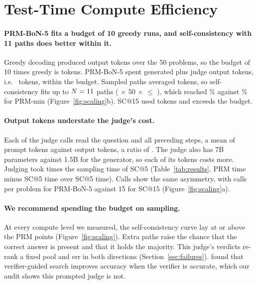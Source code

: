 \documentclass{article}
\begin{document}
\section{Test-Time Compute Efficiency}
\label{sec:compute}

\paragraph{PRM-BoN-5 fits a budget of 10 greedy runs, and self-consistency with 11 paths does better within it.} Greedy decoding produced \greedyTokens{} output tokens over the 50 problems, so the budget of 10 times greedy is \budgetTenX{} tokens. PRM-BoN-5 spent \prmGenTokens{} generated plus \prmJudgeOut{} judge output tokens, i.e.\ \prmSpent{} tokens, within the budget. Sampled paths averaged \genPerSample{} tokens, so self-consistency fits up to $N=11$ paths (\largestSCN{} $\times$ 50 $\times$ \genPerSample{} $\le$ \budgetTenX), which reached \accSCeleven\% against \accPRMmin\% for PRM-min (Figure~\ref{fig:scaling}b). SC@15 used \scTokensFifteen{} tokens and exceeds the budget.

\paragraph{Output tokens understate the judge's cost.} Each of the \judgeCalls{} judge calls read the question and all preceding steps, a mean of \judgeInPerCall{} prompt tokens against \judgeOutPerCall{} output tokens, a ratio of \judgeInOverOut. The judge also has 7B parameters against 1.5B for the generator, so each of its tokens costs more. Judging took \judgeTimeOverSC{} times the sampling time of SC@5 (Table~\ref{tab:results}, PRM time minus SC@5 time over SC@5 time). Calls show the same asymmetry, with \callsPRMperProblem{} calls per problem for PRM-BoN-5 against 15 for SC@15 (Figure~\ref{fig:scaling}a).

\paragraph{We recommend spending the budget on sampling.} At every compute level we measured, the self-consistency curve lay at or above the PRM points (Figure~\ref{fig:scaling}). Extra paths raise the chance that the correct answer is present and that it holds the majority. This judge's verdicts re-rank a fixed pool and err in both directions (Section~\ref{sec:failures}). \citet{snell2024scalingllmtesttimecompute} found that verifier-guided search improves accuracy when the verifier is accurate, which our audit shows this prompted judge is not.
\end{document}
